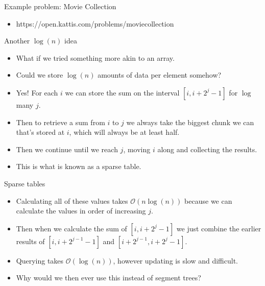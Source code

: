 \documentclass{beamer}
\begin{document}
\begin{frame}[plain]{Example problem: Movie Collection}
    \begin{itemize}
        \item https://open.kattis.com/problems/moviecollection
    \end{itemize}
\end{frame}

\begin{frame}[plain]{Another $\log(n)$ idea}
    \begin{itemize}
        \item<1-> What if we tried something more akin to an array.
        \item<2-> Could we store $\log(n)$ amounts of data per element somehow?
        \item<3-> Yes! For each $i$ we can store the sum on the interval $[i, i + 2^j - 1]$ for $\log$ many $j$.
        \item<4-> Then to retrieve a sum from $i$ to $j$ we always take the biggest chunk we can that's stored at $i$, which will always be at least half.
        \item<5-> Then we continue until we reach $j$, moving $i$ along and collecting the results.
        \item<6-> This is what is known as a sparse table.
    \end{itemize}
\end{frame}

\begin{frame}[plain]{Sparse tables}
    \begin{itemize}
        \item<1-> Calculating all of these values takes $\mathcal{O}(n\log(n))$ because we can calculate the values in order of increasing $j$.
        \item<2-> Then when we calculate the sum of $[i, i + 2^j - 1]$ we just combine the earlier results of $[i, i + 2^{j-1} - 1]$ and $[i + 2^{j-1}, i + 2^j - 1]$.
        \item<3-> Querying takes $\mathcal{O}(\log(n))$, however updating is slow and difficult.
        \item<4-> Why would we then ever use this instead of segment trees?
    \end{itemize}
\end{frame}
\end{document}
